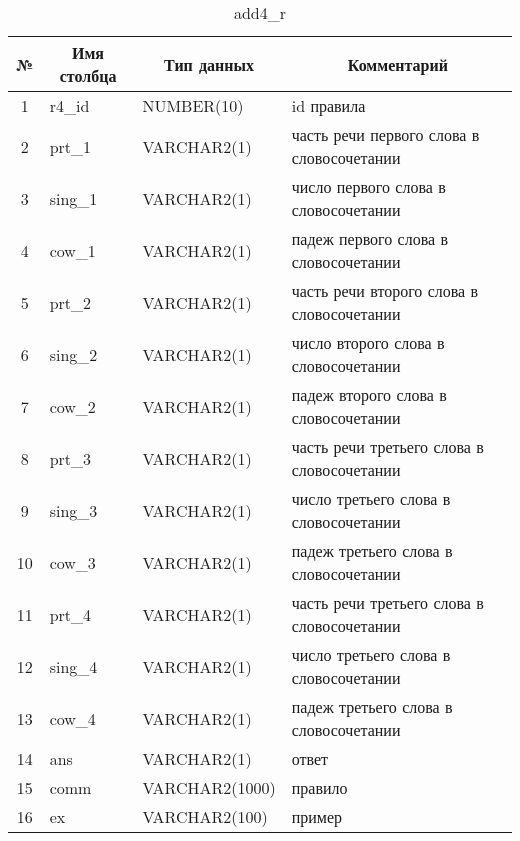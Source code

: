 \documentclass[main]{subfiles}
\begin{document}
\begin{table}[!h]
	\begin{center}
		\captionsetup{format=hang,labelsep = endash, singlelinecheck=false}
		\caption{add4\_r}\label{tab5}
		\begin{tabular}{|c|l|l|p{220px}|}
			\hline
			\textbf{№} & \multicolumn{1}{c|}{\textbf{Имя столбца}} & \multicolumn{1}{c|}{\textbf{Тип данных}} & \multicolumn{1}{c|}{\textbf{Комментарий}} \\ \hline
			1&r4\_id & NUMBER(10)&id правила\\ \hline
			2& prt\_1 &VARCHAR2(1) & часть речи первого слова в словосочетании \\ \hline
			3& sing\_1 & VARCHAR2(1)& число первого слова в словосочетании \\ \hline
			4& cow\_1 &VARCHAR2(1) & падеж первого слова в словосочетании \\ \hline
			5& prt\_2 &VARCHAR2(1) & часть речи второго слова в словосочетании \\ \hline
			6& sing\_2 & VARCHAR2(1)& число второго слова в словосочетании \\ \hline
			7& cow\_2 &VARCHAR2(1) & падеж второго слова в словосочетании \\ \hline
			8& prt\_3 &VARCHAR2(1) & часть речи третьего слова в словосочетании \\ \hline
			9& sing\_3 & VARCHAR2(1)& число третьего слова в словосочетании \\ \hline
			10& cow\_3 &VARCHAR2(1) & падеж третьего слова в словосочетании \\ \hline
			11& prt\_4 &VARCHAR2(1) & часть речи третьего слова в словосочетании \\ \hline
			12& sing\_4 &VARCHAR2(1) & число третьего слова в словосочетании \\ \hline
			13& cow\_4 & VARCHAR2(1)& падеж третьего слова в словосочетании \\ \hline
			14&ans&VARCHAR2(1)& ответ\\ \hline
			15&comm &VARCHAR2(1000)& правило\\ \hline
			16 &ex &VARCHAR2(100)&пример  \\ \hline
		\end{tabular}
	\end{center}
\end{table}
\end{document}
